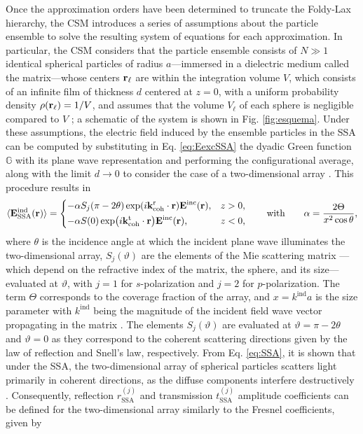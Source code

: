 Once the approximation orders have been determined to truncate the Foldy-Lax hierarchy, the CSM introduces a series of assumptions about the particle ensemble to solve the resulting system of equations for each approximation. In particular, the CSM considers that the particle ensemble consists of $N \gg 1$ identical spherical particles of radius $a$—immersed in a dielectric medium called the matrix—whose centers $\vb{r}_\ell$ are within the integration volume $V$, which consists of an infinite film of thickness $d$ centered at $z=0$, with a uniform probability density $\rho(\vb{r}_\ell)= 1 /V$, and assumes that the volume $V_\ell$ of each sphere is negligible compared to $V$ \cite{barrera_coherent_2003}; a schematic of the system is shown in Fig. \ref{fig:esquema}. Under these assumptions, the electric field induced by the ensemble particles in the SSA can be computed by substituting in Eq. \eqref{eq:EexcSSA} the dyadic Green function $\mathbb{G}$ with its plane wave representation and performing the configurational average, along with the limit $d\to0$ to consider the case of a two-dimensional array \cite{barrera_coherent_2003}. This procedure results in
%
\begin{align}
	\langle \vb{E}_\text{SSA}^\text{ind}(\vb{r})\rangle =
	\begin{dcases}
		-\alpha   S_j(\pi-2\theta) \exp(i\vb{k}^\text{r}_\text{coh}\cdot\vb{r}) \vb{E}^\text{inc}(\vb{r}), & z>0, \\
		- \alpha S(0) \exp(i\vb{k}^\text{t}_\text{coh}\cdot\vb{r}) \vb{E}^\text{inc}(\vb{r}), & z<0,
	\end{dcases}
	\qquad \text{with} \qquad
	\alpha = \frac{2\Theta}{x^2 \cos\theta},
	\label{eq:SSA}
\end{align}
%
where $\theta$ is the incidence angle at which the incident plane wave illuminates the two-dimensional array, $S_j(\vartheta)$ are the elements of the Mie scattering matrix \cite{bohren_absorption_1983}—which depend on the refractive index of the matrix, the sphere, and its size—evaluated at $\vartheta$, with $j=1$ for $s$-polarization and $j=2$ for $p$-polarization. The term $\Theta$ corresponds to the coverage fraction of the array, and $x = k^\text{ind}a$ is the size parameter with $k^\text{ind}$ being the magnitude of the incident field wave vector propagating in the matrix \cite{barrera_coherent_2003,garcia2012multiple}. The elements $S_j(\vartheta)$ are evaluated at $\vartheta = \pi-2\theta$ and $\vartheta = 0$ as they correspond to the coherent scattering directions given by the law of reflection and Snell’s law, respectively. From Eq. \eqref{eq:SSA}, it is shown that under the SSA, the two-dimensional array of spherical particles scatters light primarily in coherent directions, as the diffuse components interfere destructively \cite{barrera_coherent_2003}. Consequently, reflection $r^{(j)}_\text{SSA}$ and transmission $t^{(j)}_\text{SSA}$ amplitude coefficients can be defined for the two-dimensional array similarly to the Fresnel coefficients, given by
